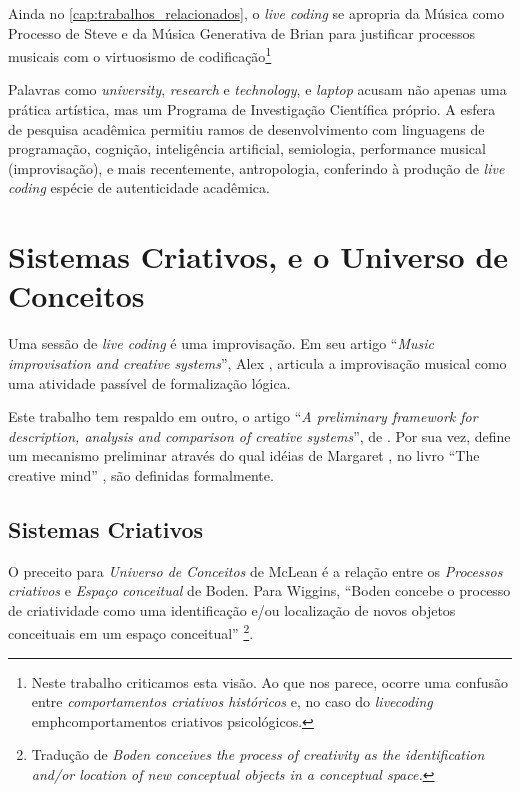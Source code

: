Ainda no \autoref{cap:trabalhos_relacionados}, o \emph{live coding} se apropria da Música como Processo de Steve  e da Música Generativa de Brian  para justificar processos musicais com o virtuosismo de codificação\footnote{Neste trabalho criticamos esta visão. Ao que nos parece, ocorre uma confusão entre \emph{comportamentos criativos históricos} e, no caso do \emph{livecoding} emph{comportamentos criativos psicológicos}.}  

Palavras como \emph{university}, \emph{research} e \emph{technology}, e \emph{laptop} acusam não apenas uma prática artística, mas um Programa de Investigação Científica próprio. A esfera de pesquisa acadêmica permitiu ramos de desenvolvimento com linguagens de programação, cognição, inteligência artificial, semiologia, performance musical (improvisação), e mais recentemente, antropologia, conferindo à produção de \emph{live coding} espécie de autenticidade acadêmica.

\section{Sistemas Criativos, e o Universo de Conceitos}\label{sec:universo}

Uma sessão de \emph{live coding} é uma improvisação. Em seu artigo ``\emph{Music improvisation and creative systems}'', Alex ,  articula a improvisação musical como uma atividade passível de formalização lógica. 

Este trabalho tem respaldo em outro, o artigo ``\emph{A preliminary framework for description, analysis and comparison of creative systems}'', de . Por sua vez, define um mecanismo preliminar através do qual idéias de Margaret , no livro ``The creative mind'' , são definidas formalmente.

\subsection{Sistemas Criativos}

O preceito para \emph{Universo de Conceitos} de McLean é a relação entre os \emph{Processos criativos} e \emph{Espaço conceitual} de Boden. Para Wiggins, ``Boden concebe o processo de criatividade como uma identificação e/ou localização de novos objetos conceituais em um espaço conceitual'' \cite[p.~450]{wiggins_framework_2006}\footnote{Tradução de \emph{Boden conceives the process of creativity as the identification and/or location of new conceptual objects in a conceptual space.}}.

